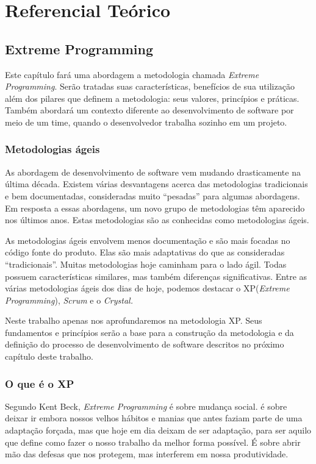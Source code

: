 \part{Referencial Teórico}

\chapter[Extreme Programming]{Extreme Programming}

Este capítulo fará uma abordagem a metodologia chamada \textit{Extreme Programming}. Serão tratadas suas características, benefícios de sua utilização além dos pilares que definem a metodologia: seus valores, princípios e práticas.
Também abordará um contexto diferente ao desenvolvimento de software por meio de um time, quando o desenvolvedor trabalha sozinho em um projeto.

\section{Metodologias ágeis}

As abordagem de desenvolvimento de software vem mudando drasticamente na última década. Existem várias desvantagens acerca das metodologias tradicionais e bem documentadas, consideradas muito “pesadas” para algumas abordagens. Em resposta a essas abordagens, um novo grupo de metodologias têm aparecido nos últimos anos. Estas metodologias são as conhecidas como metodologias ágeis. \cite{Agarwal:2008}

As metodologias ágeis envolvem menos documentação e são mais focadas no código fonte do produto. Elas são mais adaptativas do que as consideradas “tradicionais”. Muitas metodologias hoje caminham para o lado ágil. Todas possuem características similares, mas também diferenças significativas. Entre as várias metodologias ágeis dos dias de hoje, podemos destacar o XP(\textit{Extreme Programming}), \textit{Scrum} e o \textit{Crystal.} \cite{Agarwal:2008}

Neste trabalho apenas nos aprofundaremos na metodologia XP. Seus fundamentos e princípios serão a base para a construção da metodologia e da definição do processo de desenvolvimento de software descritos no próximo capítulo deste trabalho.

\section{O que é o XP}

Segundo Kent Beck, \cite{Beck:2004} \textit{Extreme Programming} é sobre mudança social. é sobre deixar ir embora nossos velhos hábitos e manias que antes faziam parte de uma adaptação forçada, mas que hoje em dia deixam de ser adaptação, para ser aquilo que define como fazer o nosso trabalho da melhor forma possível. É sobre abrir mão das defesas que nos protegem, mas interferem em nossa produtividade.

